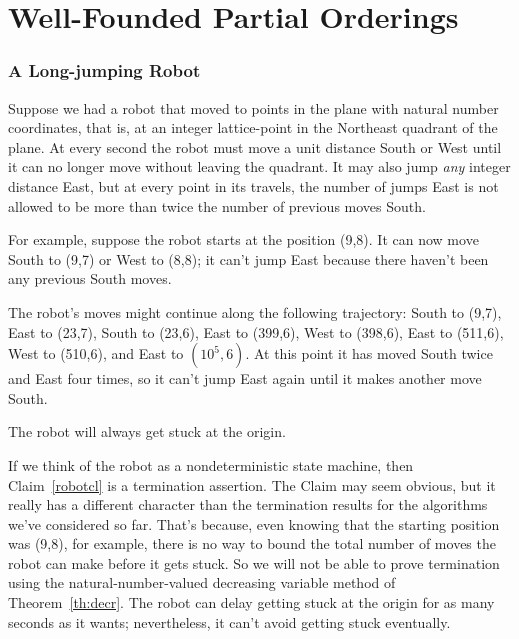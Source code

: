 
\def\vl{\text{value}}


\chapter{Well-Founded Partial Orderings}

\subsection{A Long-jumping Robot}

\iffalse Begin by defining the trivial ``pick how long'' game: P1 picks $n
\in \naturals$, the P2 and P1 alternate making forced moves.  The game
ends after $n$ forced moves; the last person to move wins.  So P1 strategy
is ``pick and even number.''  Insert here the discussion of ``terminates,
but no bound on number of steps...'' used below.

May also tell the ``guess a bigger number game''joke.
\fi

Suppose we had a robot that moved to points in the plane with natural
number coordinates, that is, at an integer lattice-point in the Northeast
quadrant of the plane.  At every second the robot must move a unit
distance South or West until it can no longer move without leaving the
quadrant.  It may also jump \emph{any} integer distance East, but at every
point in its travels, the number of jumps East is not allowed to be more
than twice the number of previous moves South.

For example, suppose the robot starts at the position (9,8).  It can now
move South to (9,7) or West to (8,8); it can't jump East because there
haven't been any previous South moves.

The robot's moves might continue along the following trajectory: South to
(9,7), East to (23,7), South to (23,6), East to (399,6), West to (398,6),
East to (511,6), West to (510,6), and East to $(10^5,6)$.  At this point
it has moved South twice and East four times, so it can't jump East again
until it makes another move South.

\begin{claim}\label{robotcl}
The robot will always get stuck at the origin.
\end{claim}

If we think of the robot as a nondeterministic state machine, then
Claim~\ref{robotcl} is a termination assertion.  The Claim may seem
obvious, but it really has a different character than the termination
results for the algorithms we've considered so far.  That's because, even
knowing that the starting position was (9,8), for example, there is no
way to bound the total number of moves the robot can make before it gets
stuck.  So we will not be able to prove termination using the
natural-number-valued decreasing variable method of Theorem~\ref{th:decr}.
The robot can delay getting stuck at the origin for as many seconds as it
wants; nevertheless, it can't avoid getting stuck eventually.

